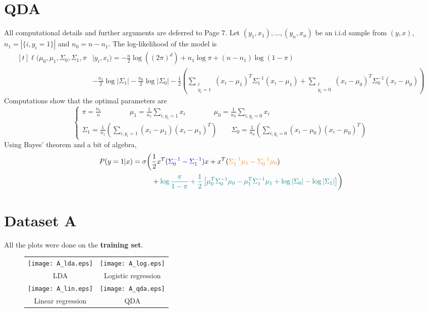 \documentclass[a4paper,11pt]{article}
\begin{document}
\section*{QDA}
All computational details and further arguments are deferred to Page 7. Let $(y_1,x_1),\ldots,(y_n,x_n)$ be an i.i.d sample from $(y,x)$, $n_1=|\{i, y_i=1\}|$ and $n_0=n-n_1$. The log-likelihood of the model is $$\begin{aligned}[t]\ell(\mu_0,\mu_1,\Sigma_0,\Sigma_1,\pi&|y_i,x_i) = -\frac n2 \log((2\pi)^d)+ n_1\log \pi +(n-n_1)\log(1-\pi)\\ &-\frac {n_1}2 \log |\Sigma_1|-\frac {n_0}2 \log |\Sigma_0| -\frac 12 \left( \sum_{\substack{i\\y_i=1}}(x_i-\mu_1)^T\Sigma_1^{-1}(x_i-\mu_1) + \sum_{\substack{i\\y_i=0}}(x_i-\mu_0)^T\Sigma_0^{-1}(x_i-\mu_0)\right)\end{aligned}$$
Computations show that the optimal parameters are $$\begin{cases}
  \pi = \frac{n_1}n\quad \quad \quad \quad\mu_1= \frac{1}{n_1}\sum_{i,y_i=1} x_i \quad \quad \quad \quad \mu_0 = \frac{1}{n_0}\sum_{i,y_i=0} x_i\\
  \Sigma_1 = \frac 1{n_1}\left(\sum_{i,y_i=1} (x_i-\mu_1)(x_i-\mu_1)^T \right) \quad \quad \Sigma_0 = \frac 1{n_0}\left(\sum_{i,y_i=0} (x_i-\mu_0)(x_i-\mu_0)^T \right)
\end{cases}$$
Using Bayes' theorem and a bit of algebra, $$\begin{aligned}P(y=1|x)=\sigma\bigg(&
\frac 12 x^T(\color{blue}{\Sigma_0^{-1}-\Sigma_1^{-1}}\color{black})x + x^T(\color{orange}{\Sigma_1^{-1}\mu_1-\Sigma_0^{-1}\mu_0}\color{black})\\&+\color{teal}{\log\frac{\pi}{1-\pi}+\frac 12 \left[\mu_0^T\Sigma_0^{-1}\mu_0 - \mu_1^T\Sigma_1^{-1}\mu_1 + \log |\Sigma_0| - \log |\Sigma_1|\right]}
\color{black}\bigg)\end{aligned}$$

\newpage
\section*{Dataset A}
All the plots were done on the \textbf{training set}.
\begin{figure}[h!]
\centering
\begin{tabular}{cc}
  \texttt{[image: A\_lda.eps]} &   \texttt{[image: A\_log.eps]} \\
LDA & Logistic regression \\[6pt]
 \texttt{[image: A\_lin.eps]} &   \texttt{[image: A\_qda.eps]} \\
Linear regression & QDA \\[6pt]
\end{tabular}
\end{figure}
\end{document}

